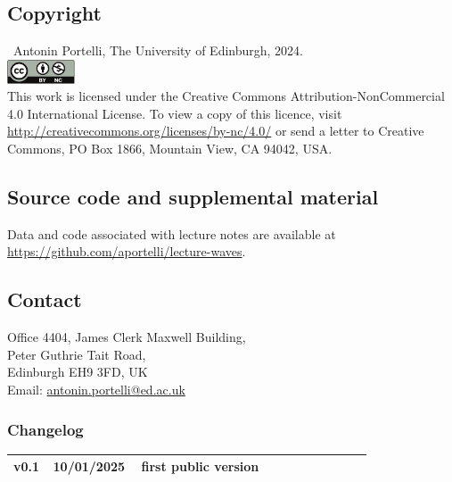 \documentclass[a4paper,12pt]{book}
\theoremstyle{plain}
\theoremstyle{plain}
\theoremstyle{plain}
\theoremstyle{plain}
\theoremstyle{definition}
\theoremstyle{definition}
\begin{document}
{ \footnotesize %
  \subsection*{Copyright}
  \textcopyright~Antonin Portelli, The University of Edinburgh, 2024.
  \vspace*{10pt}\\
  \noindent\includegraphics[width=2cm]{by-nc.pdf}\\
  This work is licensed under the Creative Commons
  Attribution-NonCommercial 4.0 International
  License. To view a copy of this licence, visit
  \url{http://creativecommons.org/licenses/by-nc/4.0/} or send a
  letter to Creative Commons, PO
  Box 1866, Mountain View, CA 94042, USA.

  \subsection*{Source code and supplemental material}
  Data and code associated with lecture notes are available at
  \url{https://github.com/aportelli/lecture-waves}.

  \subsection*{Contact}
  Office 4404, James Clerk Maxwell Building,\\
  Peter Guthrie Tait Road,\\
  Edinburgh EH9 3FD, UK\\
  Email: \href{mailto:antonin.portelli@ed.ac.uk}{antonin.portelli@ed.ac.uk}

  \vfill
  \subsubsection*{Changelog}
  \scriptsize
  \begin{tabular}{@{} L{0.05\linewidth} L{0.15\linewidth} L{0.6\linewidth} @{}}
    \toprule
    v0.1 & 10/01/2025 & first public version\\
    \bottomrule
  \end{tabular}
}

\tableofcontents
\glsaddallunused
\printglossary[title=Symbols and Notation]
\end{document}
